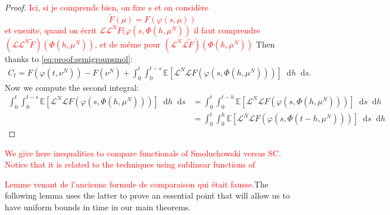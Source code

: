 \documentclass[11pt,a4paper]{article}
\newcommand{\LC}{\mathcal{L}}
\newcommand{\red}[1]{\textcolor{red}{#1}}
\newcommand{\E}[1]{\mathbb{E}\left[#1\right]}
\newcommand{\dd}{\mathop{}\!\mathrm{d}}
\begin{document}
\begin{proof}
    \red{Ici, si je comprends bien, on fixe $s$ et on considère 
    \[\tilde{F}(\mu) = F(\varphi(s,\mu))\]
    et ensuite, quand on écrit $\LC \LC^N F(\varphi(s,\Phi(h,\mu^N))$ il faut comprendre
    $(\LC \LC^N \tilde{F})(\Phi(h,\mu^N))$, et de même pour $( \LC^N \LC\tilde{F})(\Phi(h,\mu^N))$}
    Then thanks to \eqref{eq:proof:semigroupsmol}:
    \begin{align*}
        C_t = F\left(\varphi(t,\nu^N)\right) -  F(\nu^N) + \int_0^t \int_0^{t-s}\E{\LC^N \LC  F(\varphi(s,\Phi(h,\mu^N)))}\dd h \dd s.
    \end{align*}
    Now we compute the second integral:
    \begin{align*}
        \int_0^t \int_0^{t-s}\E{\LC^N \LC  F(\varphi(s,\Phi(h,\mu^N)))}\dd h \dd s
        &= \int_0^t \int_0^{t-h}\E{\LC^N \LC  F(\varphi(s,\Phi(h,\mu^N)))}\dd s \dd h \\
        &= \int_0^t \int_0^{h}\E{\LC^N \LC  F(\varphi(s,\Phi(t-h,\mu^N)))}\dd s \dd h
    \end{align*}
\end{proof}

\red{We give here inequalities to compare functionals of Smoluchowski versus SC. Notice that it is related to the techniques using sublinear functions of \cite{norris}  }


\red{Lemme venant de l'ancienne formule de comparaison qui était fausse.}The following lemma uses the latter to prove an essential point that will allow us to have uniform bounds in time in our main theorems.
\end{document}
